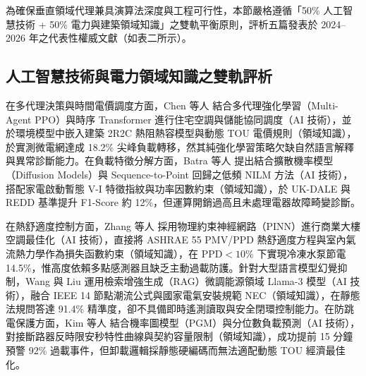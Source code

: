 \documentclass[conference]{IEEEtran}
\begin{document}
為確保垂直領域代理兼具演算法深度與工程可行性，本節嚴格遵循「50\% 人工智慧技術 + 50\% 電力與建築領域知識」之雙軌平衡原則，評析五篇發表於 2024--2026 年之代表性權威文獻（如表二所示）。

\subsection{人工智慧技術與電力領域知識之雙軌評析}
在多代理決策與時間電價調度方面，Chen 等人 \cite{chen2024} 結合多代理強化學習（Multi-Agent PPO）與時序 Transformer 進行住宅空調與儲能協同調度（AI 技術），並於環境模型中嵌入建築 2R2C 熱阻熱容模型與動態 TOU 電價規則（領域知識），於實測微電網達成 18.2\% 尖峰負載轉移，然其純強化學習策略欠缺自然語言解釋與異常診斷能力。在負載特徵分解方面，Batra 等人 \cite{batra2025} 提出結合擴散機率模型（Diffusion Models）與 Sequence-to-Point 回歸之低頻 NILM 方法（AI 技術），搭配家電啟動暫態 V-I 特徵指紋與功率因數約束（領域知識），於 UK-DALE 與 REDD 基準提升 F1-Score 約 12\%，但運算開銷過高且未處理電器故障畸變診斷。

在熱舒適度控制方面，Zhang 等人 \cite{zhang2025} 採用物理約束神經網路（PINN）進行商業大樓空調最佳化（AI 技術），直接將 ASHRAE 55 PMV/PPD 熱舒適度方程與室內氣流熱力學作為損失函數約束（領域知識），在 $\text{PPD} < 10\%$ 下實現冷凍水泵節電 14.5\%，惟高度依賴多點感測器且缺乏主動過載防護。針對大型語言模型幻覺抑制，Wang 與 Liu \cite{wang2026} 運用檢索增強生成（RAG）微調能源領域 Llama-3 模型（AI 技術），融合 IEEE 14 節點潮流公式與國家電氣安裝規範 NEC（領域知識），在靜態法規問答達 91.4\% 精準度，卻不具備即時遙測讀取與安全閉環控制能力。在防跳電保護方面，Kim 等人 \cite{kim2024} 結合機率圖模型（PGM）與分位數負載預測（AI 技術），對接斷路器反時限安秒特性曲線與契約容量限制（領域知識），成功提前 15 分鐘預警 92\% 過載事件，但卸載邏輯採靜態硬編碼而無法適配動態 TOU 經濟最佳化。
\end{document}
